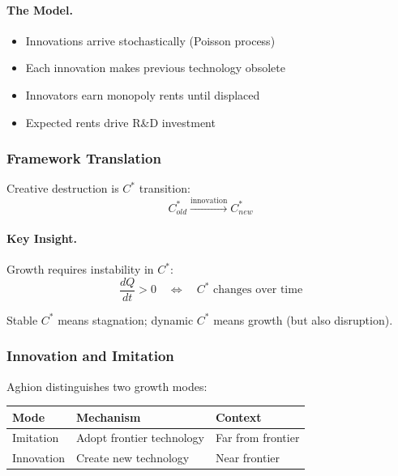 \paragraph{The Model.}
\begin{itemize}
    \item Innovations arrive stochastically (Poisson process)
    \item Each innovation makes previous technology obsolete
    \item Innovators earn monopoly rents until displaced
    \item Expected rents drive R\&D investment
\end{itemize}

\subsubsection{Framework Translation}

Creative destruction is $C^*$ transition:
\begin{equation}
C^*_{old} \xrightarrow{\text{innovation}} C^*_{new}
\end{equation}

\paragraph{Key Insight.}
Growth requires instability in $C^*$:
\begin{equation}
\frac{dQ}{dt} > 0 \quad \Leftrightarrow \quad C^* \text{ changes over time}
\end{equation}

Stable $C^*$ means stagnation; dynamic $C^*$ means growth (but also disruption).

\subsubsection{Innovation and Imitation}

Aghion distinguishes two growth modes:

\begin{center}
\renewcommand{\arraystretch}{1.3}
\begin{tabular}{|l|l|l|}
\hline
\textbf{Mode} & \textbf{Mechanism} & \textbf{Context} \\
\hline
Imitation & Adopt frontier technology & Far from frontier \\
Innovation & Create new technology & Near frontier \\
\hline
\end{tabular}
\end{center}

